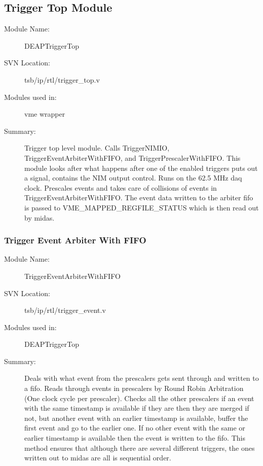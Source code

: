 	\subsection{Trigger Top Module}
	\label{sec:trigTop}
	\begin{description}
	\item[Module Name:] DEAPTriggerTop
	\item[SVN Location:]  tsb/ip/rtl/trigger\_top.v
	\item[Modules used in:] vme wrapper
	\item[Summary: ]Trigger top level module. Calls TriggerNIMIO, TriggerEventArbiterWithFIFO, and TriggerPrescalerWithFIFO. This module looks after what happens after one of the enabled triggers puts out a signal, contains the NIM output control. Runs on the 62.5 MHz \gls{daq} clock. Prescales events and takes care of collisions of events in TriggerEventArbiterWithFIFO. The event data written to the arbiter \gls{fifo} is passed to VME\_MAPPED\_REGFILE\_STATUS which is then read out by \gls{midas}. 
	
	\end{description}	
	
		\subsubsection{Trigger Event Arbiter With FIFO}
		\label{sec:triggerEventArbiterWithFIFO}
		\begin{description}
		\item[Module Name:] TriggerEventArbiterWithFIFO
		\item[SVN Location:]  tsb/ip/rtl/trigger\_event.v
		\item[Modules used in:] DEAPTriggerTop
		\item[Summary:] Deals with what event from the prescalers gets sent through and written to a \gls{fifo}. Reads through events in prescalers by Round Robin Arbitration (One clock cycle per prescaler). Checks all the other prescalers if an event with the same timestamp is available if they are then they are merged if not, but another event with an earlier timestamp is available, buffer the first event and go to the earlier one. If no other event with the same or earlier timestamp is available then the event is written to the \gls{fifo}. This method ensures that although there are several different triggers, the ones written out to \gls{midas} are all is sequential order.
		
		\end{description}
	
